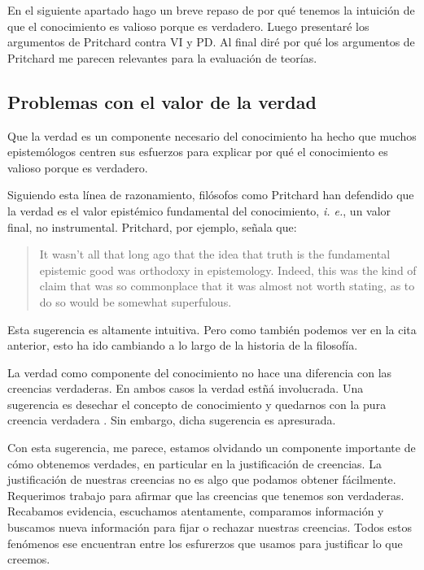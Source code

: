 En el siguiente apartado hago un breve repaso de por qué tenemos la intuición de que el conocimiento es valioso porque es verdadero.
Luego presentaré los argumentos de Pritchard contra VI y PD.
Al final diré por qué los argumentos de Pritchard me parecen relevantes para la evaluación de teorías.

\subsection{Problemas con el valor de la verdad}

Que la verdad es un componente necesario del conocimiento ha hecho que muchos epistemólogos centren sus esfuerzos para explicar por qué el conocimiento es valioso porque es verdadero.

Siguiendo esta línea de razonamiento, filósofos como Pritchard \parencite{pritchard2021a} han defendido que la verdad es el valor epistémico fundamental del conocimiento, \textit{i. e.}, un valor final, no instrumental.
Pritchard, por ejemplo, señala que:

\begin{quote}
   It wasn’t all that long ago that the idea that truth is the fundamental epistemic good was orthodoxy in epistemology. Indeed, this was the kind of claim that was so commonplace that it was almost not worth stating, as to do so would be somewhat superfulous. \parencite{pritchard2021a}
\end{quote}

Esta sugerencia es altamente intuitiva.
Pero como también podemos ver en la cita anterior, esto ha ido cambiando a lo largo de la historia de la filosofía.

La verdad como componente del conocimiento no hace una diferencia con las creencias verdaderas.
En ambos casos la verdad estñá involucrada.
Una sugerencia es desechar el concepto de conocimiento y quedarnos con la pura creencia verdadera \parencite{papineau2021}.
Sin embargo, dicha sugerencia es apresurada.

Con esta sugerencia, me parece, estamos olvidando un componente importante de cómo obtenemos verdades, en particular en la justificación de creencias.
La justificación de nuestras creencias no es algo que podamos obtener fácilmente.
Requerimos trabajo para afirmar que las creencias que tenemos son verdaderas.
Recabamos evidencia, escuchamos atentamente, comparamos información y buscamos nueva información para fijar o rechazar nuestras creencias.
Todos estos fenómenos ese encuentran entre los esfurerzos que usamos para justificar lo que creemos.

